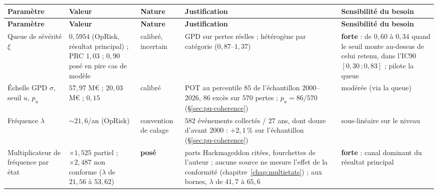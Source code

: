 \vspace{0.25cm}
{\footnotesize
\renewcommand{\arraystretch}{1.28}
\begin{longtable}{@{}>{\raggedright\arraybackslash}p{2.7cm}
                    >{\raggedright\arraybackslash}p{2.6cm}
                    >{\raggedright\arraybackslash}p{1.7cm}
                    >{\raggedright\arraybackslash}p{4.0cm}
                    >{\raggedright\arraybackslash}p{3.6cm}@{}}
\toprule
\textbf{Paramètre} & \textbf{Valeur} & \textbf{Nature} & \textbf{Justification} & \textbf{Sensibilité du besoin} \\
\midrule
\endfirsthead
\toprule
\textbf{Paramètre} & \textbf{Valeur} & \textbf{Nature} & \textbf{Justification} & \textbf{Sensibilité du besoin} \\
\midrule
\endhead
\bottomrule
\endlastfoot
Queue de sévérité $\xi$ & $0{,}5954$ (OpRisk, résultat principal) ; PRC $1{,}03$ ; $0{,}90$ posé en pire cas de modèle & calibré, incertain & GPD sur pertes réelles ; hétérogène par catégorie ($0{,}87$--$1{,}37$) & \textbf{forte} : de $0{,}60$ à $0{,}34$ quand le seuil monte au-dessus de celui retenu, dans l'IC90 $[0{,}30\,;0{,}83]$ ; pilote la queue \\
Échelle GPD $\sigma$, seuil $u$, $p_u$ & $57{,}97$ M\euro{} ; $20{,}03$ M\euro{} ; $0{,}15$ & calibré & POT au percentile $85$ de l'échantillon 2000--2026, $86$ excès sur $570$ pertes ; $p_u=86/570$ (\S\ref{sec:pu-coherence}) & modérée (via la queue) \\
Fréquence $\lambda$ & ${\sim}21{,}6$/an (OpRisk) & convention de calage & $582$ événements collectés / 27 ans, dont douze d'avant 2000 : $+2{,}1\,\%$ sur l'échantillon (\S\ref{sec:pu-coherence}) & sous-linéaire sur le niveau \\
Multiplicateur de fréquence par état & $\times 1{,}525$ partiel ; $\times 2{,}487$ non conforme ($\lambda$ de $21{,}56$ à $53{,}62$) & \textbf{posé} & parts Hackmageddon citées, fourchettes de l'auteur ; aucune source ne mesure l'effet de la conformité (chapitre~\ref{chap:multietats}) ; aux bornes, $\lambda$ de $41{,}7$ à $65{,}6$ & \textbf{forte} : canal dominant du résultat principal \\

\end{longtable}}
